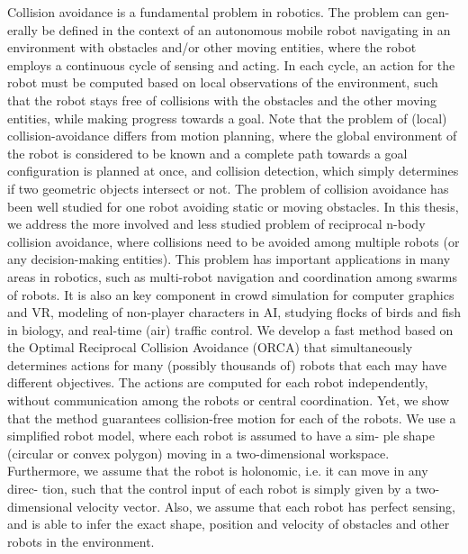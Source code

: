 \documentclass[12pt]{report}
\begin{document}
Collision avoidance is a fundamental problem in robotics. The problem can gen-
erally be defined in the context of an autonomous mobile robot navigating in an
environment with obstacles and/or other moving entities, where the robot employs a
continuous cycle of sensing and acting. In each cycle, an action for the robot must be
computed based on local observations of the environment, such that the robot stays
free of collisions with the obstacles and the other moving entities, while making
progress towards a goal. Note that the problem of (local) collision-avoidance differs from motion planning, where the global environment of the robot is considered to be known and a complete path towards a goal configuration is planned at once, and collision detection, which simply determines if two geometric objects intersect or not.
The problem of collision avoidance has been well studied for one robot avoiding static or moving obstacles. In this thesis, we address the more involved and less studied problem of reciprocal n-body collision avoidance, where collisions need to be avoided among multiple robots (or any decision-making entities). This problem has important applications in many areas in robotics, such as multi-robot navigation and coordination among swarms of robots. It is also an key component in crowd simulation for computer graphics and VR, modeling of non-player characters in AI, studying flocks of birds and fish in biology, and real-time (air) traffic control. We develop a fast method based on the Optimal Reciprocal Collision Avoidance (ORCA) that simultaneously determines actions for many (possibly thousands of) robots that each may have different objectives. The actions are computed for each robot independently, without communication among the robots or central coordination. Yet, we show that the method guarantees collision-free motion for each of the robots.
We use a simplified robot model, where each robot is assumed to have a sim-
ple shape (circular or convex polygon) moving in a two-dimensional workspace.
Furthermore, we assume that the robot is holonomic, i.e. it can move in any direc-
tion, such that the control input of each robot is simply given by a two-dimensional
velocity vector. Also, we assume that each robot has perfect sensing, and is able
to infer the exact shape, position and velocity of obstacles and other robots in the
environment.
\end{document}
